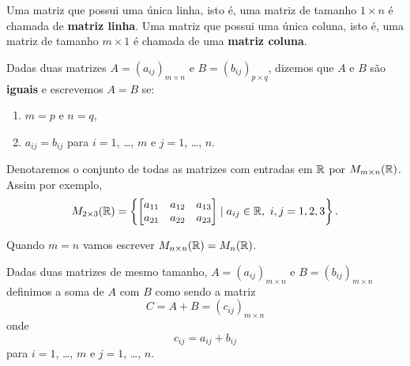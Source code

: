 \documentclass{beamer}
\begin{document}
    \begin{frame}
    \begin{definicao}
      Uma matriz que possui uma única linha, isto é, uma matriz de tamanho $1 \times n$ é chamada de \textbf{matriz linha}. Uma matriz que possui uma única coluna, isto é, uma matriz de tamanho $m \times 1$  é chamada de uma \textbf{matriz coluna}.
    \end{definicao}

    \begin{definicao}
      Dadas duas matrizes $A = (a_{ij})_{m \times n}$ e $B = (b_{ij})_{p \times q}$, dizemos que $A$ e $B$ são \textbf{iguais}
      e escrevemos $A = B$ se:
      \begin{enumerate}[label={\arabic*})]
        \item $m = p$ e $n = q$,
        \item $a_{ij} = b_{ij}$ para $i = 1$, \dots, $m$ e $j = 1$, \dots, $n$.
      \end{enumerate}
    \end{definicao}
  \end{frame}

  \begin{frame}
    \begin{observacao}
      Denotaremos o conjunto de todas as matrizes com entradas em $\mathbb{R}$ por $M_{m \times n}(\mathbb{R})$. Assim por exemplo,
      \[
          M_{2 \times 3}(\mathbb{R}) = \left\{\begin{bmatrix}a_{11} & a_{12} & a_{13}\\ a_{21} & a_{22} & a_{23}\end{bmatrix} \mid a_{ij} \in \mathbb{R},\ i,j = 1,2,3\right\}.
      \]

      Quando $m = n$ vamos escrever $M_{n \times n}(\mathbb{R}) = M_n(\mathbb{R})$.

    \end{observacao}
  \end{frame}

  \begin{frame}
    \begin{definicao}
      Dadas duas matrizes de mesmo tamanho, $A = (a_{ij})_{m \times n}$ e $B = (b_{ij})_{m \times n}$ definimos a soma de $A$ com $B$
      como sendo a matriz
      \[
        C = A + B = (c_{ij})_{m \times n}
      \]
      onde
      \[
        c_{ij} = a_{ij} + b_{ij}
      \]
      para $i = 1$, \dots, $m$ e $j = 1$, \dots, $n$.
    \end{definicao}
  \end{frame}
\end{document}
